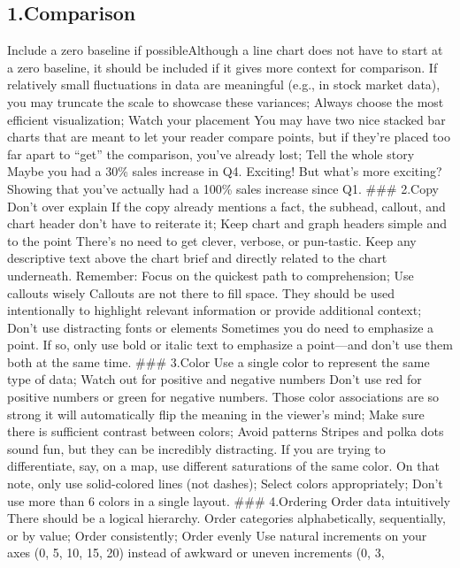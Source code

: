 \documentclass[]{book}
\theoremstyle{definition}
\theoremstyle{definition}
\theoremstyle{definition}
\theoremstyle{remark}
\begin{document}
\subsection{1.Comparison}\label{comparison}

Include a zero baseline if possibleAlthough a line chart does not have
to start at a zero baseline, it should be included if it gives more
context for comparison. If relatively small fluctuations in data are
meaningful (e.g., in stock market data), you may truncate the scale to
showcase these variances; Always choose the most efficient
visualization; Watch your placement You may have two nice stacked bar
charts that are meant to let your reader compare points, but if they're
placed too far apart to ``get'' the comparison, you've already lost;
Tell the whole story Maybe you had a 30\% sales increase in Q4.
Exciting! But what's more exciting? Showing that you've actually had a
100\% sales increase since Q1. \#\#\# 2.Copy Don't over explain If the
copy already mentions a fact, the subhead, callout, and chart header
don't have to reiterate it; Keep chart and graph headers simple and to
the point There's no need to get clever, verbose, or pun-tastic. Keep
any descriptive text above the chart brief and directly related to the
chart underneath. Remember: Focus on the quickest path to comprehension;
Use callouts wisely Callouts are not there to fill space. They should be
used intentionally to highlight relevant information or provide
additional context; Don't use distracting fonts or elements Sometimes
you do need to emphasize a point. If so, only use bold or italic text to
emphasize a point---and don't use them both at the same time. \#\#\#
3.Color Use a single color to represent the same type of data; Watch out
for positive and negative numbers Don't use red for positive numbers or
green for negative numbers. Those color associations are so strong it
will automatically flip the meaning in the viewer's mind; Make sure
there is sufficient contrast between colors; Avoid patterns Stripes and
polka dots sound fun, but they can be incredibly distracting. If you are
trying to differentiate, say, on a map, use different saturations of the
same color. On that note, only use solid-colored lines (not dashes);
Select colors appropriately; Don't use more than 6 colors in a single
layout. \#\#\# 4.Ordering Order data intuitively There should be a
logical hierarchy. Order categories alphabetically, sequentially, or by
value; Order consistently; Order evenly Use natural increments on your
axes (0, 5, 10, 15, 20) instead of awkward or uneven increments (0, 3,
\end{document}
